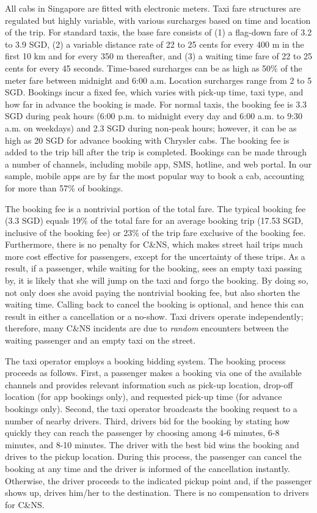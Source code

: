 \documentclass[reviewmode,AEJ]{AEA}
\begin{document}
All cabs in Singapore are fitted with electronic meters. Taxi fare structures are regulated but 
highly variable, with various surcharges based on time and location of the trip. 
For standard taxis, the base fare consists of (1) a flag-down fare of 3.2 to 3.9 SGD, 
(2) a variable distance rate of 22 to 25 cents for every 400 m in the first 10 km and for every 350 m thereafter, 
and (3) a waiting time fare of 22 to 25 cents for every 45 seconds. Time-based surcharges can be as high as 50\% 
of the meter fare between midnight and 6:00 a.m. Location surcharges range from 2 to 5 SGD. Bookings incur a fixed
fee, which varies with pick-up time, taxi type, and how far in advance the booking is made. For normal taxis,
the booking fee is 3.3 SGD during peak hours (6:00 p.m. to midnight every day and 6:00 a.m. to 9:30 a.m. 
on weekdays) and 2.3 SGD during non-peak hours; however, it can be as high as 20 SGD for advance booking
with Chrysler cabs. The booking fee is added to the trip bill after the trip is completed. 
Bookings can be made through a number of channels, including mobile app, SMS, hotline, and web portal.
In our sample, mobile apps are by far the most popular way to book a cab, accounting for more than 57\% of bookings.

The booking fee is a nontrivial portion of the total fare. The typical booking fee (3.3 SGD) equals 19\% 
of the total fare for an average booking trip (17.53 SGD, inclusive of the booking fee) or 23\% of the trip 
fare exclusive of the booking fee. Furthermore, there is no penalty for C\&NS, which makes street hail trips 
much more cost effective for passengers, except for the uncertainty of these trips. 
As a result, if a passenger, while waiting for the booking, sees an empty taxi passing by, 
it is likely that she will jump on the taxi and forgo the booking. By doing so, not only does she avoid
paying the nontrivial booking fee, but also shorten the waiting time. Calling back to cancel the booking is optional,
and hence this can result in either a cancellation or a no-show. Taxi drivers operate independently; 
therefore, many C\&NS incidents are due to \textit{random} encounters between the waiting passenger and an
empty taxi on the street.

The taxi operator employs a booking bidding system. The booking process proceeds as follows. 
First, a passenger makes a booking via one of the available channels and provides relevant information 
such as pick-up location, drop-off location (for app bookings only), and requested pick-up time 
(for advance bookings only). Second, the taxi operator broadcasts the booking request to a number of 
nearby drivers. Third, drivers bid for the booking by stating how quickly they can reach the passenger 
by choosing among 4-6 minutes, 6-8 minutes, and 8-10 minutes. The driver with the best bid wins the
booking and drives to the pickup location. During this process, the passenger can cancel the booking
at any time and the driver is informed of the cancellation instantly. Otherwise, the driver proceeds
to the indicated pickup point and, if the passenger shows up, drives him/her to the destination. 
There is no compensation to drivers for C\&NS.
\end{document}
